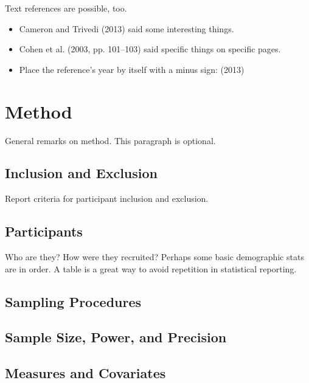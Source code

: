 \documentclass[
  floatsintext,
  man,
  colorlinks=true,linkcolor=blue,citecolor=blue,urlcolor=blue,biblatex]{apa7}
\begin{document}
Text references are possible, too.

\begin{itemize}
\item
  Cameron and Trivedi (2013) said some interesting things.
\item
  Cohen et al. (2003, pp. 101--103) said specific things on specific
  pages.
\item
  Place the reference's year by itself with a minus sign: (2013)
\end{itemize}

\hypertarget{method}{%
\section{Method}\label{method}}

General remarks on method. This paragraph is optional.

\hypertarget{inclusion-and-exclusion}{%
\subsection{Inclusion and Exclusion}\label{inclusion-and-exclusion}}

Report criteria for participant inclusion and exclusion.

\hypertarget{participants}{%
\subsection{Participants}\label{participants}}

Who are they? How were they recruited? Perhaps some basic demographic
stats are in order. A table is a great way to avoid repetition in
statistical reporting.

\hypertarget{sampling-procedures}{%
\subsection{Sampling Procedures}\label{sampling-procedures}}

\hypertarget{sample-size-power-and-precision}{%
\subsection{Sample Size, Power, and
Precision}\label{sample-size-power-and-precision}}

\hypertarget{measures-and-covariates}{%
\subsection{Measures and Covariates}\label{measures-and-covariates}}
\end{document}
